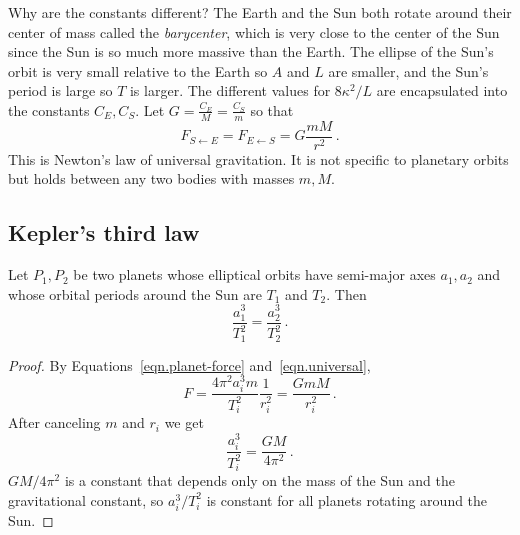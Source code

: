Why are the constants different? The Earth and the Sun both rotate around their center of mass called the \emph{barycenter}, which is very close to the center of the Sun since the Sun is so much more massive than the Earth. The ellipse of the Sun's orbit is very small relative to the Earth so $A$ and $L$ are smaller, and the Sun's period is large so $T$ is larger. The different values for $8\kappa^2/L$ are encapsulated into the constants $C_E,C_S$. Let $G=\displaystyle\frac{C_E}{M}=\frac{C_S}{m}$ so that
\begin{equation}
F_{S\leftarrow E}=F_{E\leftarrow S}=G\frac{mM}{r^2}\,.\label{eqn.universal}
\end{equation}%
This is Newton's law of universal gravitation. It is not specific to planetary orbits but holds between any two bodies with masses $m,M$.

\subsection{Kepler's third law}

\begin{theorem}
Let $P_1, P_2$ be two planets whose elliptical orbits have semi-major axes $a_1, a_2$ and whose orbital periods around the Sun are $T_1$ and $T_2$. Then
\[
\frac{a_1^3}{T_1^2}=\frac{a_2^3}{T_2^2}\,.
\]
\end{theorem}
\begin{proof}
By Equations~\ref{eqn.planet-force} and~\ref{eqn.universal},
\begin{equation}
F=\frac{4\pi^2 a_i^3 m}{T_i^2}\frac{1}{r_i^2}=\frac{GmM}{r_i^2}\,.\label{eqn.third-law}
\end{equation}
After canceling $m$ and $r_i$ we get
\[
\frac{a_i^3}{T_i^2}=\frac{GM}{4\pi^2}\,.
\]
$GM/4\pi^2$ is a constant that depends only on the mass of the Sun and the gravitational constant, so $a_i^3/T_i^2$ is constant for all planets rotating around the Sun.\hqed
\end{proof}
